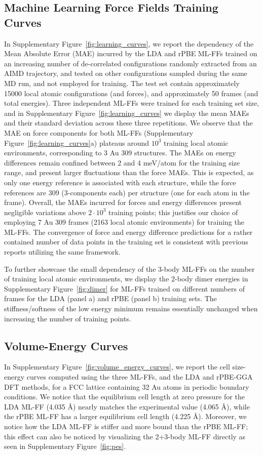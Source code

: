 \documentclass[%
aip,
 amsmath,amssymb,
 reprint,
]{revtex4-1}
\begin{document}
\subsection*{Machine Learning Force Fields Training Curves}
%
In Supplementary Figure~\ref{fig:learning_curves}, we report the dependency of the Mean Absolute Error (MAE) incurred by the LDA and rPBE ML-FFs trained on an increasing number of de-correlated configurations randomly extracted from an AIMD trajectory, and tested on other configurations sampled during the same MD run, and not employed for training.
%
The test set contain approximately 15000 local atomic configurations (and forces), and approximately 50 frames (and total energies).
%
Three independent ML-FFs were trained for each training set size, and in Supplementary Figure~\ref{fig:learning_curves} we display the mean MAEs and their standard deviation across these three repetitions.
%
We observe that the MAE on force components for both ML-FFs (Supplementary Figure~\ref{fig:learning_curves}a) plateaus around $10^3$ training local atomic environments, corresponding to 3 Au 309 structures.
%
The MAEs on energy differences remain confined between 2 and 4 meV/atom for the training size range, and present larger fluctuations than the force MAEs.
%
This is expected, as only one energy reference is associated with each structure, while the force references are 309 (3-components each) per structure (one for each atom in the frame).
%
Overall, the MAEs incurred for forces and energy differences present negligible variations above $2\cdot10^3$ training points; this justifies our choice of employing 7 Au 309 frames (2163 local atomic environments) for training the ML-FFs.
%
The convergence of force and energy difference predictions for a rather contained number of data points in the training set is consistent with previous reports utilizing the same framework. \cite{Glielmo2018,Zeni2018}
%

To further showcase the small dependency of the 3-body ML-FFs on the number of training local atomic environments, we display the 2-body dimer energies in Supplementary Figure~\ref{fig:dimer} for ML-FFs trained on different numbers of frames for the LDA (panel a) and rPBE (panel b) training sets.
%
The stiffness/softness of the low energy minimum remains essentially unchanged when increasing the number of training points.
%


\subsection*{Volume-Energy Curves}
%
In Supplementary Figure~\ref{fig:volume_energy_curves}, we report the cell size-energy curves computed using the three ML-FFs, and the LDA and rPBE-GGA DFT methods, for a FCC lattice containing 32 Au atoms in periodic boundary conditions.
%
We notice that the equilibrium cell length at zero pressure for the LDA ML-FF (4.035 $\text{\AA}$) nearly matches the experimental value (4.065 $\text{\AA}$), while the rPBE ML-FF has a larger equilibrium cell length (4.225 $\text{\AA}$).
%
Moreover, we notice how the LDA ML-FF is stiffer and more bound than the rPBE ML-FF; this effect can also be noticed by visualizing the 2+3-body ML-FF directly as seen in Supplementary Figure~\ref{fig:pes}.
%
\end{document}
